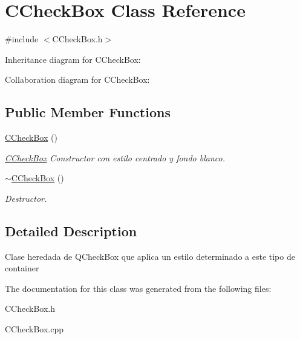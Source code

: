 \hypertarget{classCCheckBox}{}\section{C\+Check\+Box Class Reference}
\label{classCCheckBox}


{\ttfamily \#include $<$C\+Check\+Box.\+h$>$}



Inheritance diagram for C\+Check\+Box\+:


Collaboration diagram for C\+Check\+Box\+:
\subsection*{Public Member Functions}
\begin{DoxyCompactItemize}
\item 
\hyperlink{classCCheckBox_ae4ff02f8007433bdf27553a850b52a24}{C\+Check\+Box} ()\hypertarget{classCCheckBox_ae4ff02f8007433bdf27553a850b52a24}{}\label{classCCheckBox_ae4ff02f8007433bdf27553a850b52a24}

\begin{DoxyCompactList}\small\item\em \hyperlink{classCCheckBox}{C\+Check\+Box} Constructor con estilo centrado y fondo blanco. \end{DoxyCompactList}\item 
\hyperlink{classCCheckBox_ac4fdbd75eb1d520151a6ad3af37371d0}{$\sim$\+C\+Check\+Box} ()\hypertarget{classCCheckBox_ac4fdbd75eb1d520151a6ad3af37371d0}{}\label{classCCheckBox_ac4fdbd75eb1d520151a6ad3af37371d0}

\begin{DoxyCompactList}\small\item\em Destructor. \end{DoxyCompactList}\end{DoxyCompactItemize}


\subsection{Detailed Description}
Clase heredada de \textquotesingle{}Q\+Check\+Box\textquotesingle{} que aplica un estilo determinado a este tipo de container 

The documentation for this class was generated from the following files\+:\begin{DoxyCompactItemize}
\item 
C\+Check\+Box.\+h\item 
C\+Check\+Box.\+cpp\end{DoxyCompactItemize}
